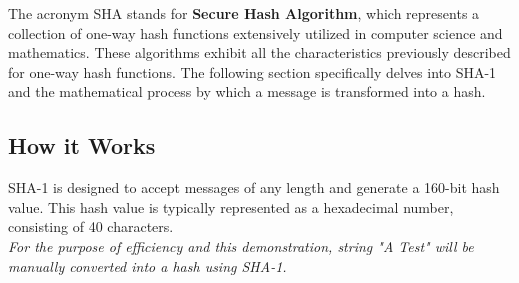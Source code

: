 \documentclass[12pt]{extarticle}
\begin{document}
\label{SHA}
The acronym SHA stands for \textbf{Secure Hash Algorithm}, which represents a collection of one-way hash functions extensively utilized in computer science and mathematics. These algorithms exhibit all the characteristics previously described for one-way hash functions. The following section specifically delves into SHA-1 and the mathematical process by which a message is transformed into a hash.

\subsection{How it Works}
SHA-1 is designed to accept messages of any length and generate a 160-bit hash value. This hash value is typically represented as a hexadecimal number, consisting of 40 characters.\\
{\slshape{For the purpose of efficiency and this demonstration, string "A Test" will be manually converted into a hash using SHA-1.}}
\end{document}
